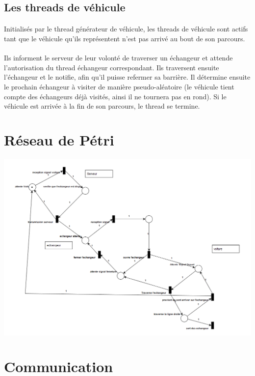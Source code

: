 \documentclass{report}
\begin{document}
	\subsection{Les threads de véhicule}
	\paragraph{}
	Initialisés par le thread générateur de véhicule, les threads de véhicule sont actifs tant que le véhicule qu'ils représentent n'est pas arrivé au bout de son parcours.
	\paragraph{}
	Ils informent le serveur de leur volonté de traverser un échangeur et attende l'autorisation du thread échangeur correspondant. Ils traversent ensuite l'échangeur et le notifie, afin qu'il puisse refermer sa barrière. Il détermine ensuite le prochain échangeur à visiter de manière pseudo-aléatoire (le véhicule tient compte des échangeurs déjà visités, ainsi il ne tournera pas en rond). Si le véhicule est arrivée à la fin de son parcours, le thread se termine.
	\newpage
	\section{Réseau de Pétri}
	\begin{center}
	\includegraphics[scale=0.4]{Petri}
	\end{center}
	
		\newpage
	
	\section{Communication}
\end{document}

